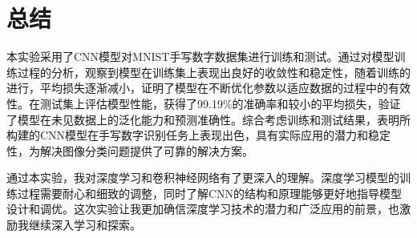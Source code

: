 \section{总结}\label{sec:conclusion}

本实验采用了CNN模型对MNIST手写数字数据集进行训练和测试。通过对模型训练过程的分析，观察到模型在训练集上表现出良好的收敛性和稳定性，随着训练的进行，平均损失逐渐减小，证明了模型在不断优化参数以适应数据的过程中的有效性。在测试集上评估模型性能，获得了99.19\%的准确率和较小的平均损失，验证了模型在未见数据上的泛化能力和预测准确性。综合考虑训练和测试结果，表明所构建的CNN模型在手写数字识别任务上表现出色，具有实际应用的潜力和稳定性，为解决图像分类问题提供了可靠的解决方案。

通过本实验，我对深度学习和卷积神经网络有了更深入的理解。深度学习模型的训练过程需要耐心和细致的调整，同时了解CNN的结构和原理能够更好地指导模型设计和调优。这次实验让我更加确信深度学习技术的潜力和广泛应用的前景，也激励我继续深入学习和探索。